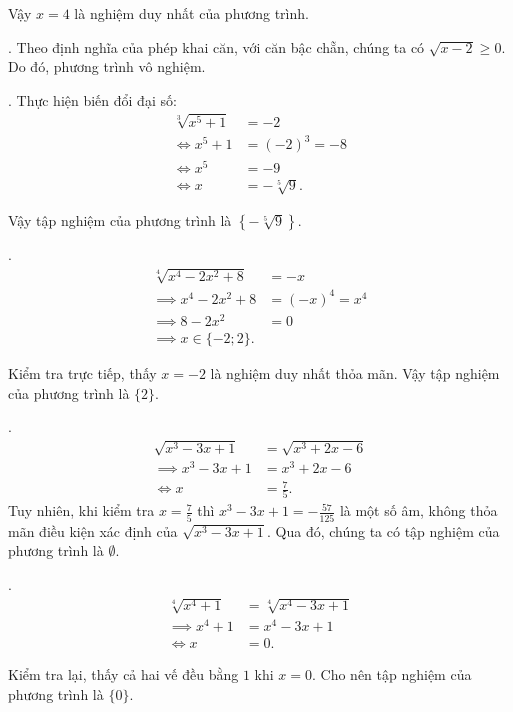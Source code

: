 Vậy $x = 4$ là nghiệm duy nhất của phương trình.

. Theo định nghĩa của phép khai căn, với căn bậc chẵn, chúng ta có $\sqrt{x - 2} \geq 0$. Do đó, phương trình vô nghiệm.

. Thực hiện biến đổi đại số:
\begin{align*}
   \sqrt[3]{x^5 + 1} &= -2 \\
   \iff x^5 + 1 &= (-2)^3 = -8 \\
   \iff x^5 &= -9 \\
   \iff x &= -\sqrt[5]{9}.
\end{align*}

Vậy tập nghiệm của phương trình là $\left\{-\sqrt[5]{9}\right\}$.

.
\begin{align*}
   \sqrt[4]{x^4-2x^2+8} &= -x \\
   \implies x^4 - 2x^2 + 8 &= (-x)^4 = x^4 \\
   \implies 8 - 2x^2 &= 0 \\
   \implies x \in \{-2; 2\}.
\end{align*}

Kiểm tra trực tiếp, thấy $x = -2$ là nghiệm duy nhất thỏa mãn. Vậy tập nghiệm của phương trình là $\{2\}$.

.
\begin{align*}
   \sqrt{x^3-3x+1} &= \sqrt{x^3+2x-6} \\
   \implies x^3-3x+1 &= x^3 + 2x - 6 \\
   \iff x &= \frac{7}{5}.
\end{align*}
Tuy nhiên, khi kiểm tra $x = \frac{7}{5}$ thì $x^3 - 3x + 1 = -\frac{57}{125}$ là một số âm, không thỏa mãn điều kiện xác định của $\sqrt{x^3-3x+1}$. Qua đó, chúng ta có tập nghiệm của phương trình là $\emptyset$.

.
\begin{align*}
   \sqrt[4]{x^4 + 1} &= \sqrt[4]{x^4 - 3x + 1} \\
   \implies x^4 + 1 &= x^4 - 3x + 1 \\
   \iff x &= 0. 
\end{align*}

Kiểm tra lại, thấy cả hai vế đều bằng $1$ khi $x = 0$. Cho nên tập nghiệm của phương trình là $\{0\}$.

